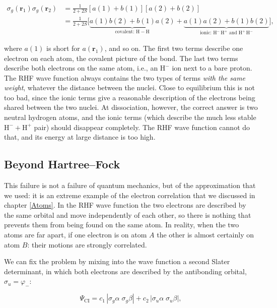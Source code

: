 \documentclass[
  english,
  9pt,
]{extbook}
\theoremstyle{definition}
\theoremstyle{definition}
\theoremstyle{definition}
\theoremstyle{definition}
\theoremstyle{remark}
\begin{document}
\begin{equation}
\begin{aligned}
\sigma_{g}(\mathbf{r}_1)\sigma_{g}(\mathbf{r}_2) &= \frac{1}{2+2S}\left[a(1)+b(1)\right]\left[a(2)+b(2)\right] \\
&= \frac{1}{2+2S} \Big[ \underbrace{a(1)b(2)+b(1)a(2)}_{\text{covalent: } \mathrm{H}\!-\!\mathrm{H}} + \underbrace{a(1)a(2)+b(1)b(2)}_{\text{ionic: } \mathrm{H}^-\,\mathrm{H}^+ \text{ and } \mathrm{H}^+\,\mathrm{H}^-} \Big],
\end{aligned}
\label{eq:bond14}
\end{equation}

where \(a(1)\) is short for \(a(\mathbf{r}_1)\), and so on. The first two terms describe one electron on each atom, the covalent picture of the bond. The last two terms describe both electrons on the same atom, i.e., an \(\mathrm{H}^-\) ion next to a bare proton. The RHF wave function always contains the two types of terms \emph{with the same weight}, whatever the distance between the nuclei. Close to equilibrium this is not too bad, since the ionic terms give a reasonable description of the electrons being shared between the two nuclei. At dissociation, however, the correct answer is two neutral hydrogen atoms, and the ionic terms (which describe the much less stable \(\mathrm{H}^-+\mathrm{H}^+\) pair) should disappear completely. The RHF wave function cannot do that, and its energy at large distance is too high.

\subsection{Beyond Hartree--Fock}\label{beyond-hartreefock}

This failure is not a failure of quantum mechanics, but of the approximation that we used: it is an extreme example of the electron correlation that we discussed in chapter \ref{Atoms}. In the RHF wave function the two electrons are described by the same orbital and move independently of each other, so there is nothing that prevents them from being found on the same atom. In reality, when the two atoms are far apart, if one electron is on atom \(A\) the other is almost certainly on atom \(B\): their motions are strongly correlated.

We can fix the problem by mixing into the wave function a second Slater determinant, in which both electrons are described by the antibonding orbital, \(\sigma_u=\varphi_-\):

\begin{equation}
\Psi_\text{CI} = c_1\, |\sigma_{g}\alpha\;\sigma_{g}\beta| + c_2\, |\sigma_{u}\alpha\;\sigma_{u}\beta|,
\label{eq:bond15}
\end{equation}
\end{document}
